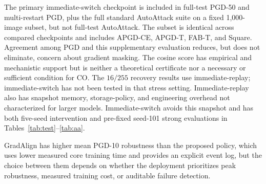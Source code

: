The primary immediate-switch checkpoint is included in full-test PGD-50 and
multi-restart PGD, plus the full standard AutoAttack suite on a fixed
1,000-image subset, but not full-test
AutoAttack. The subset is identical across compared checkpoints and includes
APGD-CE, APGD-T, FAB-T, and Square. Agreement among PGD and this supplementary
evaluation reduces, but does not eliminate, concern about gradient masking.
The cosine score has empirical and mechanistic support but is neither a
theoretical certificate nor a necessary or sufficient condition for CO.
The $16/255$ recovery results use immediate-replay; immediate-switch has not
been tested in that stress setting. Immediate-replay also has snapshot memory,
storage-policy, and engineering overhead not characterized for larger models.
Immediate-switch avoids this snapshot and has both five-seed intervention and
pre-fixed seed-101 strong evaluations in Tables~\ref{tab:test}--\ref{tab:aa}.

GradAlign has higher mean PGD-10 robustness than the proposed policy, which uses lower
measured core training time and provides an explicit event log, but the choice
between them depends on whether the deployment prioritizes peak robustness,
measured training cost, or auditable failure detection.
